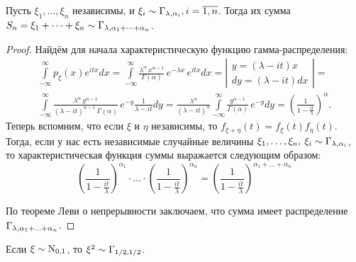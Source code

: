 \begin{lem}
    Пусть $\xi_{1}, \ldots, \xi_{n}$ независимы, и $\xi_i \sim \operatorname{\Gamma}_{\lambda, \alpha_i}, i=\overline{1,n}$. 
    Тогда их сумма $S_{n}=\xi_{1}+\cdots+\xi_{n} \sim \operatorname{\Gamma}_{\lambda, \alpha_1 + \cdots + \alpha_n}$.
\end{lem}
\begin{proof}
    Найдём для начала характеристическую функцию гамма-распределения:
    \begin{multline*}
        \int\limits_{-\infty}^{\infty} p_{\xi}(x) e^{itx} dx = 
        \int\limits_{-\infty}^{\infty} \frac{\lambda^\alpha \, x^{\alpha - 1}}{\Gamma(\alpha)} \, e^{-\lambda x}\, e^{itx} dx = 
        \left| \begin{array}{c}
            y  = (\lambda - it)x \\
            dy = (\lambda - it)dx
        \end{array} \right| = \\
        \int\limits_{-\infty}^{\infty} \frac{\lambda^\alpha \, y^{\alpha - 1}}{(\lambda - it)^{\alpha - 1} \, \Gamma(\alpha)} \, e^{-y} \frac{1}{\lambda - it} dy = 
        \frac{\lambda^\alpha}{(\lambda - it)^{\alpha}} \int\limits_{-\infty}^{\infty} \frac{y^{\alpha - 1}}{\Gamma(\alpha)} \, e^{-y} dy = 
        \left(\frac{1}{1 - \frac{it}{\lambda}} \right)^\alpha \!.
    \end{multline*}
    Теперь вспомним, что если $\xi$ и $\eta$ независимы, то $f_{\xi + \eta}(t) = f_{\xi}(t) f_{\eta}(t)$.
    Тогда, если у нас есть независимые случайные величины $\xi_1, \ldots, \xi_n, \: \xi_i \sim \operatorname{\Gamma}_{\lambda, \alpha_i}$,
    то характеристическая функция суммы выражается следующим образом:
    \begin{equation*}
        \left(\frac{1}{1 - \frac{it}{\lambda}} \right)^{\alpha_1} \cdot \ldots \cdot \left(\frac{1}{1 - \frac{it}{\lambda}} \right)^{\alpha_n} = 
        \left(\frac{1}{1 - \frac{it}{\lambda}} \right)^{\alpha_1 + \ldots + \alpha_n}
    \end{equation*}

    По теореме Леви о непрерывности заключаем, что сумма имеет распределение $\operatorname{\Gamma}_{\lambda, \alpha_1 + \ldots + \alpha_n}$.
\end{proof}

\begin{lem}
    Если $\xi \sim \operatorname{\mathrm{N}}_{0,1}$, то $\xi^2 \sim \operatorname{\Gamma}_{1/2, 1/2}$.
\end{lem}


